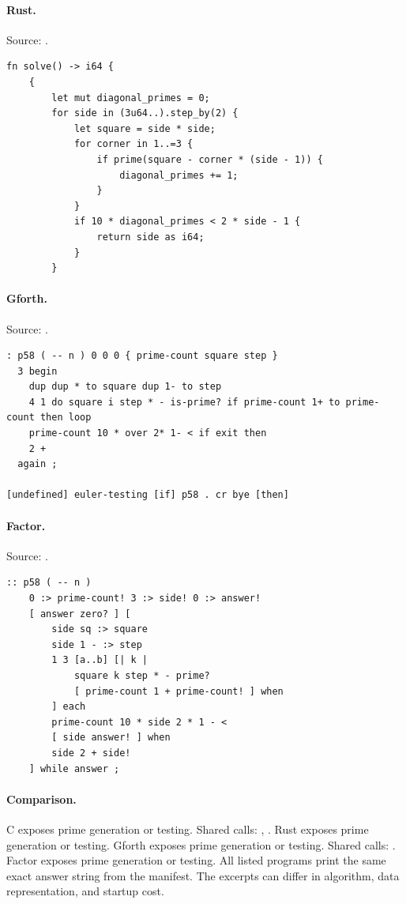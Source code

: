 \paragraph{Rust.} Source: .
\begin{lstlisting}
fn solve() -> i64 {
    {
        let mut diagonal_primes = 0;
        for side in (3u64..).step_by(2) {
            let square = side * side;
            for corner in 1..=3 {
                if prime(square - corner * (side - 1)) {
                    diagonal_primes += 1;
                }
            }
            if 10 * diagonal_primes < 2 * side - 1 {
                return side as i64;
            }
        }
\end{lstlisting}

\paragraph{Gforth.} Source: .
\begin{lstlisting}
: p58 ( -- n ) 0 0 0 { prime-count square step }
  3 begin
    dup dup * to square dup 1- to step
    4 1 do square i step * - is-prime? if prime-count 1+ to prime-count then loop
    prime-count 10 * over 2* 1- < if exit then
    2 +
  again ;

[undefined] euler-testing [if] p58 . cr bye [then]
\end{lstlisting}

\paragraph{Factor.} Source: .
\begin{lstlisting}
:: p58 ( -- n )
    0 :> prime-count! 3 :> side! 0 :> answer!
    [ answer zero? ] [
        side sq :> square
        side 1 - :> step
        1 3 [a..b] [| k |
            square k step * - prime?
            [ prime-count 1 + prime-count! ] when
        ] each
        prime-count 10 * side 2 * 1 - <
        [ side answer! ] when
        side 2 + side!
    ] while answer ;
\end{lstlisting}

\paragraph{Comparison.}
C exposes prime generation or testing. Shared calls: \texttt{}, \texttt{}. Rust exposes prime generation or testing. Gforth exposes prime generation or testing. Shared calls: \texttt{}. Factor exposes prime generation or testing.
All listed programs print the same exact answer string from the manifest. The excerpts can differ in algorithm, data representation, and startup cost.

